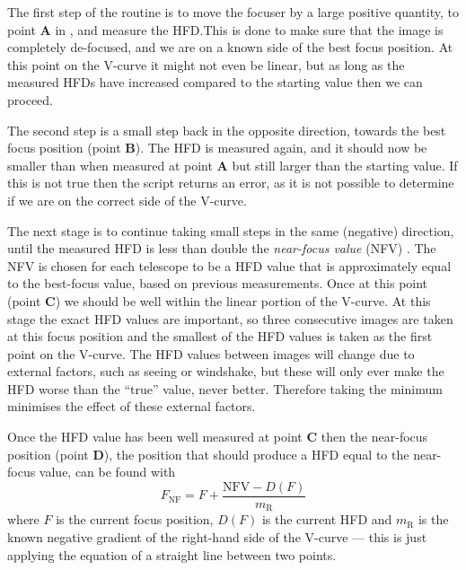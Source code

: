 \begin{colsection}
\begin{colsection}
The first step of the routine is to move the focuser by a large positive quantity, to point \textbf{A} in , and measure the HFD.\@ This is done to make sure that the image is completely de-focused, and we are on a known side of the best focus position. At this point on the V-curve it might not even be linear, but as long as the measured HFDs have increased compared to the starting value then we can proceed.

The second step is a small step back in the opposite direction, towards the best focus position (point \textbf{B}). The HFD is measured again, and it should now be smaller than when measured at point \textbf{A} but still larger than the starting value. If this is not true then the script returns an error, as it is not possible to determine if we are on the correct side of the V-curve.

The next stage is to continue taking small steps in the same (negative) direction, until the measured HFD is less than double the \emph{near-focus value} (NFV) . The NFV is chosen for each telescope to be a HFD value that is approximately equal to the best-focus value, based on previous measurements. Once at this point (point \textbf{C}) we should be well within the linear portion of the V-curve. At this stage the exact HFD values are important, so three consecutive images are taken at this focus position and the smallest of the HFD values is taken as the first point on the V-curve. The HFD values between images will change due to external factors, such as seeing or windshake, but these will only ever make the HFD worse than the ``true'' value, never better. Therefore taking the minimum minimises the effect of these external factors.

Once the HFD value has been well measured at point \textbf{C} then the near-focus position (point \textbf{D}), the position that should produce a HFD equal to the near-focus value, can be found with
%
\begin{equation}
    F_\text{NF} = F + \frac{\text{NFV} - D(F)}{m_\text{R}}
    \label{eq:nearfocus}
\end{equation}
%
where $F$ is the current focus position, $D(F)$ is the current HFD and $m_\text{R}$ is the known negative gradient of the right-hand side of the V-curve --- this is just applying the equation of a straight line between two points.


\end{colsection}
\end{colsection}
